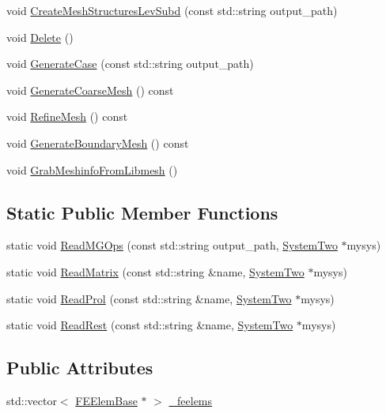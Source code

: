 \begin{DoxyCompactItemize}
void \mbox{\hyperlink{classfemus_1_1_gen_case_ab3241cafafa6233649d61074e34b1358}{Create\+Mesh\+Structures\+Lev\+Subd}} (const std\+::string output\+\_\+path)
\item 
void \mbox{\hyperlink{classfemus_1_1_gen_case_a418c8756c74bb200de5e17afd7336620}{Delete}} ()
\item 
void \mbox{\hyperlink{classfemus_1_1_gen_case_aac3e88c39000c590d4e804298e2724c6}{Generate\+Case}} (const std\+::string output\+\_\+path)
\item 
void \mbox{\hyperlink{classfemus_1_1_gen_case_a8a58afe0ec434646bc59dafb2925b0ff}{Generate\+Coarse\+Mesh}} () const
\item 
void \mbox{\hyperlink{classfemus_1_1_gen_case_adac39ccc5e6781cba188e4b4f1e682fd}{Refine\+Mesh}} () const
\item 
void \mbox{\hyperlink{classfemus_1_1_gen_case_a82dd421b7ab2256a8fa6c763dcc4787a}{Generate\+Boundary\+Mesh}} () const
\item 
void \mbox{\hyperlink{classfemus_1_1_gen_case_a16d995f5a08faf6e7cd89e9f750734e9}{Grab\+Meshinfo\+From\+Libmesh}} ()
\end{DoxyCompactItemize}
\subsection*{Static Public Member Functions}
\begin{DoxyCompactItemize}
\item 
static void \mbox{\hyperlink{classfemus_1_1_gen_case_a8ff0e1ca8e4b16e005e8a37799c43194}{Read\+M\+G\+Ops}} (const std\+::string output\+\_\+path, \mbox{\hyperlink{classfemus_1_1_system_two}{System\+Two}} $\ast$mysys)
\item 
static void \mbox{\hyperlink{classfemus_1_1_gen_case_a2b47da5519d3b8d3d3d4778bc07deef3}{Read\+Matrix}} (const std\+::string \&name, \mbox{\hyperlink{classfemus_1_1_system_two}{System\+Two}} $\ast$mysys)
\item 
static void \mbox{\hyperlink{classfemus_1_1_gen_case_a537015fb25eb05e896a2ab4da02d4c9f}{Read\+Prol}} (const std\+::string \&name, \mbox{\hyperlink{classfemus_1_1_system_two}{System\+Two}} $\ast$mysys)
\item 
static void \mbox{\hyperlink{classfemus_1_1_gen_case_a37997ccf132703dfabf7bead831f6f38}{Read\+Rest}} (const std\+::string \&name, \mbox{\hyperlink{classfemus_1_1_system_two}{System\+Two}} $\ast$mysys)
\end{DoxyCompactItemize}
\subsection*{Public Attributes}
\begin{DoxyCompactItemize}
\item 
std\+::vector$<$ \mbox{\hyperlink{classfemus_1_1_f_e_elem_base}{F\+E\+Elem\+Base}} $\ast$ $>$ \mbox{\hyperlink{classfemus_1_1_gen_case_a55901caa3145de289eb90be709f54045}{\+\_\+feelems}}
\end{DoxyCompactItemize}
